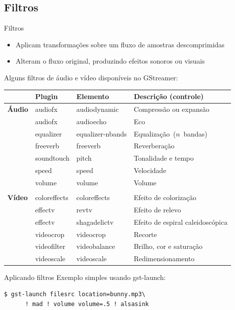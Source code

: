\documentclass{beamer}
\begin{document}
\subsection{Filtros}
\begin{frame}[fragile]{Filtros}
  \begin{itemize}
    \item Aplicam transformações sobre um fluxo de amostras descomprimidas
    \item Alteram o fluxo original, produzindo efeitos sonoros ou visuais
  \end{itemize}
  \par Alguns filtros de áudio e vídeo disponíveis no GStreamer:
  \begin{table}[h]
    \sffamily
    \scriptsize
    \centering
    \begin{tabular}{llll}
      \toprule
      &\textbf{Plugin}
      &\textbf{Elemento}
      &\textbf{Descrição (controle)}\\
      \midrule
      \textbf{Áudio}
      &audiofx    & audiodynamic & Compressão ou expansão\\
      &audiofx    & audioecho    & Eco\\
      &equalizer  & equalizer-nbands& Equalização~($n$~bandas)\\
      &freeverb   & freeverb     & Reverberação\\
      &soundtouch & pitch        & Tonalidade e tempo\\
      &speed      & speed        & Velocidade\\
      &volume     & volume       & Volume\\
      \multicolumn{4}{l}{\dotfill}\\
      \textbf{Vídeo}
      &coloreffects& coloreffects& Efeito de colorização\\
      &effectv     & revtv       & Efeito de relevo\\
      &effectv     & shagadelictv& Efeito de espiral caleidoscópica\\
      &videocrop   & videocrop   & Recorte\\
      &videofilter & videobalance& Brilho, cor e saturação\\
      &videoscale  & videoscale  & Redimensionamento\\
      \bottomrule
    \end{tabular}
  \end{table}
\end{frame}

\begin{frame}[fragile]{Aplicando filtros}
  Exemplo simples usando gst-launch:
  \begin{lstlisting}[style=command]
$ gst-launch filesrc location=bunny.mp3\
      ! mad ! volume volume=.5 ! alsasink
  \end{lstlisting}
\end{frame}
\end{document}
